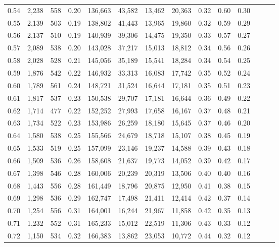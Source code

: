 \begin{tabular}{rrrrrrrrrrrrrr}
0.54 &  2,238 &  558 &  0.20 &  136,663 &   43,582 &  13,462 &  20,363 &  0.32 &  0.60 &      0.30 \\
0.55 &  2,139 &  503 &  0.19 &  138,802 &   41,443 &  13,965 &  19,860 &  0.32 &  0.59 &      0.29 \\
0.56 &  2,137 &  510 &  0.19 &  140,939 &   39,306 &  14,475 &  19,350 &  0.33 &  0.57 &      0.27 \\
0.57 &  2,089 &  538 &  0.20 &  143,028 &   37,217 &  15,013 &  18,812 &  0.34 &  0.56 &      0.26 \\
0.58 &  2,028 &  528 &  0.21 &  145,056 &   35,189 &  15,541 &  18,284 &  0.34 &  0.54 &      0.25 \\
0.59 &  1,876 &  542 &  0.22 &  146,932 &   33,313 &  16,083 &  17,742 &  0.35 &  0.52 &      0.24 \\
0.60 &  1,789 &  561 &  0.24 &  148,721 &   31,524 &  16,644 &  17,181 &  0.35 &  0.51 &      0.23 \\
0.61 &  1,817 &  537 &  0.23 &  150,538 &   29,707 &  17,181 &  16,644 &  0.36 &  0.49 &      0.22 \\
0.62 &  1,714 &  477 &  0.22 &  152,252 &   27,993 &  17,658 &  16,167 &  0.37 &  0.48 &      0.21 \\
0.63 &  1,734 &  522 &  0.23 &  153,986 &   26,259 &  18,180 &  15,645 &  0.37 &  0.46 &      0.20 \\
0.64 &  1,580 &  538 &  0.25 &  155,566 &   24,679 &  18,718 &  15,107 &  0.38 &  0.45 &      0.19 \\
0.65 &  1,533 &  519 &  0.25 &  157,099 &   23,146 &  19,237 &  14,588 &  0.39 &  0.43 &      0.18 \\
0.66 &  1,509 &  536 &  0.26 &  158,608 &   21,637 &  19,773 &  14,052 &  0.39 &  0.42 &      0.17 \\
0.67 &  1,398 &  546 &  0.28 &  160,006 &   20,239 &  20,319 &  13,506 &  0.40 &  0.40 &      0.16 \\
0.68 &  1,443 &  556 &  0.28 &  161,449 &   18,796 &  20,875 &  12,950 &  0.41 &  0.38 &      0.15 \\
0.69 &  1,298 &  536 &  0.29 &  162,747 &   17,498 &  21,411 &  12,414 &  0.42 &  0.37 &      0.14 \\
0.70 &  1,254 &  556 &  0.31 &  164,001 &   16,244 &  21,967 &  11,858 &  0.42 &  0.35 &      0.13 \\
0.71 &  1,232 &  552 &  0.31 &  165,233 &   15,012 &  22,519 &  11,306 &  0.43 &  0.33 &      0.12 \\
0.72 &  1,150 &  534 &  0.32 &  166,383 &   13,862 &  23,053 &  10,772 &  0.44 &  0.32 &      0.12 \\

\end{tabular}
